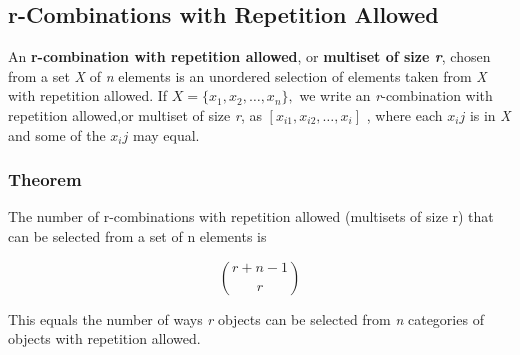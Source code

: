 \documentclass{article}
\begin{document}
\subsection{r-Combinations with Repetition Allowed}
An \textbf{r-combination with repetition allowed}, or \textbf{multiset of size \textit{r}}, chosen from a set \textit{X} of \textit{n} elements is an unordered selection of elements taken from \textit{X} with repetition allowed. If $X = \{ x_1, x_2, \ldots, x_n \},$ we write an \textit{r}-combination with repetition allowed,or multiset of size \textit{r}, as \textbf{ $[ x_{i1}, x_{i2}, \ldots, x_i]$ }, where each $x_ij$ is in \textit{X} and some of the $x_ij$ may equal.

\subsubsection{Theorem}
The number of r-combinations with repetition allowed (multisets of size r) that can be selected from a set of n elements is

\[
{{r+ n - 1}\choose{r}}
\]

This equals the number of ways \textit{r} objects can be selected from \textit{n} categories of objects with repetition allowed.
\end{document}
